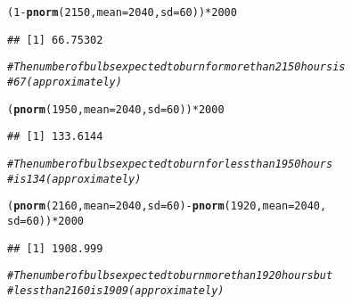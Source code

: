 \documentclass{article}\usepackage[]{graphicx}\usepackage[]{xcolor}
\makeatletter
\newcommand{\hlnum}[1]{\textcolor[rgb]{0.686,0.059,0.569}{#1}}%
\newcommand{\hlcom}[1]{\textcolor[rgb]{0.678,0.584,0.686}{\textit{#1}}}%
\newcommand{\hlopt}[1]{\textcolor[rgb]{0,0,0}{#1}}%
\newcommand{\hldef}[1]{\textcolor[rgb]{0.345,0.345,0.345}{#1}}%
\newcommand{\hlkwc}[1]{\textcolor[rgb]{0.333,0.667,0.333}{#1}}%
\newcommand{\hlkwd}[1]{\textcolor[rgb]{0.737,0.353,0.396}{\textbf{#1}}}%
\newenvironment{kframe}{%
 \def\at@end@of@kframe{}%
 \ifinner\ifhmode%
  \def\at@end@of@kframe{\end{minipage}}%
  \begin{minipage}{\columnwidth}%
 \fi\fi%
 \def\FrameCommand##1{\hskip\@totalleftmargin \hskip-\fboxsep
 \colorbox{shadecolor}{##1}\hskip-\fboxsep
     \hskip-\linewidth \hskip-\@totalleftmargin \hskip\columnwidth}%
 \MakeFramed {\advance\hsize-\width
   \@totalleftmargin\z@ \linewidth\hsize
   \@setminipage}}%
 {\par\unskip\endMakeFramed%
 \at@end@of@kframe}
\newenvironment{knitrout}{}{} %
\makeatother
\begin{document}
\begin{knitrout}
\color{fgcolor}\begin{kframe}
\begin{alltt}
\hldef{(}\hlnum{1} \hlopt{-} \hlkwd{pnorm}\hldef{(}\hlnum{2150}\hldef{,} \hlkwc{mean}\hldef{=}\hlnum{2040}\hldef{,} \hlkwc{sd}\hldef{=}\hlnum{60}\hldef{))}\hlopt{*}\hlnum{2000}
\end{alltt}
\begin{verbatim}
## [1] 66.75302
\end{verbatim}
\begin{alltt}
\hlcom{# The number of bulbs expected to burn for more than 2150 hours is}
\hlcom{# 67 (approximately)}
\end{alltt}
\end{kframe}
\end{knitrout}
\begin{knitrout}
\color{fgcolor}\begin{kframe}
\begin{alltt}
\hldef{(}\hlkwd{pnorm}\hldef{(}\hlnum{1950}\hldef{,} \hlkwc{mean}\hldef{=}\hlnum{2040}\hldef{,} \hlkwc{sd}\hldef{=}\hlnum{60}\hldef{))}\hlopt{*}\hlnum{2000}
\end{alltt}
\begin{verbatim}
## [1] 133.6144
\end{verbatim}
\begin{alltt}
\hlcom{# The number of bulbs expected to burn for less than 1950 hours }
\hlcom{# is 134 (approximately)}
\end{alltt}
\end{kframe}
\end{knitrout}
\begin{knitrout}
\color{fgcolor}\begin{kframe}
\begin{alltt}
\hldef{(} \hlkwd{pnorm}\hldef{(}\hlnum{2160}\hldef{,} \hlkwc{mean}\hldef{=}\hlnum{2040}\hldef{,} \hlkwc{sd}\hldef{=}\hlnum{60}\hldef{)} \hlopt{-} \hlkwd{pnorm}\hldef{(}\hlnum{1920}\hldef{,} \hlkwc{mean}\hldef{=}\hlnum{2040}\hldef{,}
\hlkwc{sd}\hldef{=}\hlnum{60}\hldef{))}\hlopt{*}\hlnum{2000}
\end{alltt}
\begin{verbatim}
## [1] 1908.999
\end{verbatim}
\begin{alltt}
\hlcom{# The number of bulbs expected to burn more than 1920 hours but}
\hlcom{# less than 2160 is 1909 (approximately)}
\end{alltt}
\end{kframe}
\end{knitrout}
\end{document}
